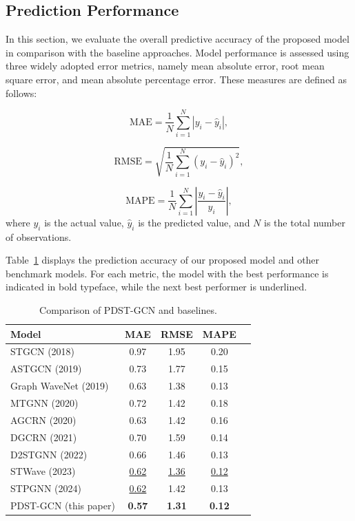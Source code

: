 \documentclass[preprint,12pt,authoryear]{elsarticle}
\begin{document}
\subsection{Prediction Performance}

In this section, we evaluate the overall predictive accuracy of the proposed model in comparison with the baseline approaches. Model performance is assessed using three widely adopted error metrics, namely mean absolute error, root mean square error, and mean absolute percentage error. These measures are defined as follows:

\begin{equation}
    \text{MAE} = \frac{1}{N} \sum_{i=1}^{N} | y_i - \hat{y}_i |,
\end{equation}

\begin{equation}
    \text{RMSE} = \sqrt{ \frac{1}{N} \sum_{i=1}^{N} ( y_i - \hat{y}_i )^2 },
\end{equation}

\begin{equation}
    \text{MAPE} = \frac{1}{N} \sum_{i=1}^{N} \left| \frac{ y_i - \hat{y}_i }{ y_i } \right|,
\end{equation}
where $y_i$ is the actual value, $\hat{y}_i$ is the predicted value, and $N$ is the total number of observations.

Table~\ref{tab2} displays the prediction accuracy of our proposed model and other benchmark models. For each metric, the model with the best performance is indicated in bold typeface, while the next best performer is underlined.

\begin{table}[H]
    \centering
    \caption{\label{tab2} Comparison of PDST-GCN and baselines.}
    \begin{tabular}{lcccc}
    \hline
    \textbf{Model} & \textbf{MAE} & \textbf{RMSE} & \textbf{MAPE} \\
    \hline
    STGCN (2018) & 0.97 & 1.95 & 0.20 \\
    ASTGCN (2019) & 0.73 & 1.77 & 0.15 \\
    Graph WaveNet (2019) & 0.63 & 1.38 & 0.13 \\
    MTGNN (2020) & 0.72 & 1.42 & 0.18 \\
    AGCRN (2020) & 0.63 & 1.42 & 0.16 \\
    DGCRN (2021) & 0.70 & 1.59 & 0.14 \\
    D2STGNN (2022) & 0.66 & 1.46 & 0.13 \\
    STWave (2023) & \underline{0.62} & \underline{1.36} & \underline{0.12} \\
    STPGNN (2024) & \underline{0.62} & 1.42 & 0.13 \\
    PDST-GCN (this paper) & {\bf 0.57} & {\bf 1.31} &  \bf{0.12} \\
    \hline
    \end{tabular}
\end{table}
\end{document}
